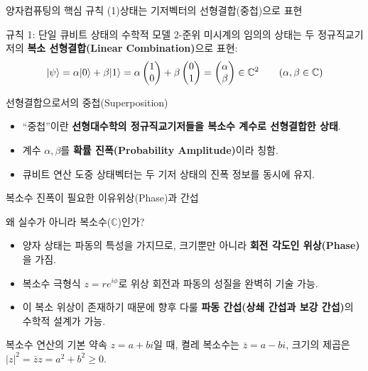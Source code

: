 \documentclass[aspectratio=169, 10pt]{beamer}
\begin{document}
\begin{frame}{양자컴퓨팅의 핵심 규칙 (1)}{상태는 기저벡터의 선형결합(중첩)으로 표현}\pause
    \begin{block}{규칙 1: 단일 큐비트 상태의 수학적 모델}
        2-준위 미시계의 임의의 상태는 두 정규직교기저의 \textbf{복소 선형결합(Linear Combination)}으로 표현:
        $$|\psi\rangle = \alpha|0\rangle + \beta|1\rangle = \alpha\begin{pmatrix} 1 \\ 0 \end{pmatrix} + \beta\begin{pmatrix} 0 \\ 1 \end{pmatrix} = \begin{pmatrix} \alpha \\ \beta \end{pmatrix} \in \mathbb{C}^2 \qquad (\alpha, \beta \in \mathbb{C})$$
    \end{block}\pause
    \vspace{0.2cm}
    \begin{exampleblock}{선형결합으로서의 중첩(Superposition)}
        \begin{itemize}
            \item ``중첩''이란 \textbf{선형대수학의 정규직교기저들을 복소수 계수로 선형결합한 상태}.\pause
            \item 계수 $\alpha, \beta$를 \textbf{확률 진폭(Probability Amplitude)}이라 칭함.\pause
            \item 큐비트 연산 도중 상태벡터는 두 기저 상태의 진폭 정보를 동시에 유지.
        \end{itemize}
    \end{exampleblock}
\end{frame}

\begin{frame}{복소수 진폭이 필요한 이유}{위상(Phase)과 간섭}\pause
    \begin{block}{왜 실수가 아니라 복소수($\mathbb{C}$)인가?}
        \begin{itemize}
            \item 양자 상태는 파동의 특성을 가지므로, 크기뿐만 아니라 \textbf{회전 각도인 위상(Phase)}을 가짐.\pause
            \item 복소수 극형식 $z = r e^{i\phi}$로 위상 회전과 파동의 성질을 완벽히 기술 가능.\pause
            \item 이 복소 위상이 존재하기 때문에 향후 다룰 \textbf{파동 간섭(상쇄 간섭과 보강 간섭)}의 수학적 설계가 가능.
        \end{itemize}
    \end{block}\pause
    \vspace{0.2cm}
    \begin{block}{복소수 연산의 기본 약속}
        $z = a + bi$일 때, 켤레 복소수는 $\overline{z} = a - bi$, 크기의 제곱은 $|z|^2 = \overline{z}z = a^2 + b^2 \ge 0$.
    \end{block}
\end{frame}
\end{document}
